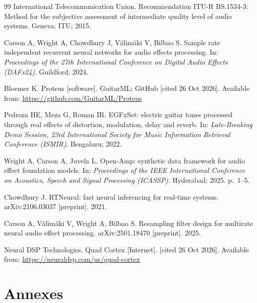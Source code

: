 \documentclass[ENG]{TFUOC}%
\begin{document}
\begin{thebibliography}{99}
 International Telecommunication Union. Recommendation ITU-R BS.1534-3: Method for the subjective assessment of intermediate quality level of audio systems. Geneva: ITU; 2015.

 Carson A, Wright A, Chowdhury J, Välimäki V, Bilbao S. Sample rate independent recurrent neural networks for audio effects processing. In: \emph{Proceedings of the 27th International Conference on Digital Audio Effects (DAFx24)}. Guildford; 2024.

 Bloemer K. Proteus [software]. GuitarML; GitHub [cited 26 Oct 2026]. Available from: \url{https://github.com/GuitarML/Proteus}

 Pedroza HE, Meza G, Roman IR. EGFxSet: electric guitar tones processed through real effects of distortion, modulation, delay and reverb. In: \emph{Late-Breaking Demo Session, 23rd International Society for Music Information Retrieval Conference (ISMIR)}. Bengaluru; 2022.

 Wright A, Carson A, Juvela L. Open-Amp: synthetic data framework for audio effect foundation models. In: \emph{Proceedings of the IEEE International Conference on Acoustics, Speech and Signal Processing (ICASSP)}. Hyderabad; 2025. p.~1--5.

 Chowdhury J. RTNeural: fast neural inferencing for real-time systems. arXiv:2106.03037 [preprint]. 2021.

 Carson A, Välimäki V, Wright A, Bilbao S. Resampling filter design for multirate neural audio effect processing. arXiv:2501.18470 [preprint]. 2025.

 Neural DSP Technologies. Quad Cortex [Internet]. [cited 26 Oct 2026]. Available from: \url{https://neuraldsp.com/us/quad-cortex}

\end{thebibliography}
\endgroup

\chapter{Annexes}
\end{document}
